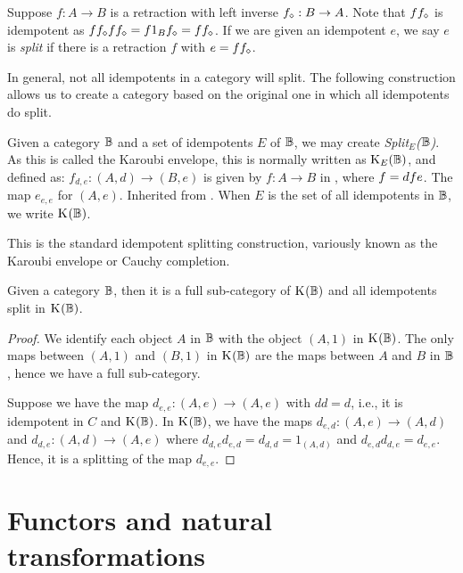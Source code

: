 Suppose $f:A \to B$ is a retraction with left inverse ${f}_\diamond:B \to A$. Note that $f
{f}_\diamond$ is idempotent as $f {f}_\diamond f {f}_\diamond = f 1_B {f}_\diamond = f
{f}_\diamond$. If we are given an idempotent $e$, we say $e$ is \emph{split} if there is a
retraction $f$ with $e = f {f}_\diamond$.

In general, not all idempotents in a category will split. The following construction allows us to
create a category based on the original one in which all idempotents do split.

\begin{definition}\label{def:split_category}
  Given a category $\mathbb{B}$ and a set of idempotents $E$ of $\mathbb{B}$, we may create \emph{Split${}_E$($\mathbb{B}$)}.
  As this is called the Karoubi envelope, this is normally written as $\text{K}_{E}(\mathbb{B})$, and defined as:
    {$f_{d,e}:(A,d)\to(B,e)$ is given by $f:A\to B$ in \B, where $f = d\hspace{0.1pt} f e$.}
    {The map $e_{e,e}$ for $(A,e)$.}
    {Inherited from \B.}
  When $E$ is the set of all idempotents in $\mathbb{B}$, we write $\text{K}_{}(\mathbb{B})$.
\end{definition}
This is the standard idempotent splitting construction, variously known as the Karoubi
envelope or Cauchy completion.

\begin{lemma}\label{lem:split_category_splits_and_has_category}
  Given a category $\mathbb{B}$, then it is a full sub-category of $\text{K}_{}(\mathbb{B})$ and all idempotents split
  in  $\text{K}_{}(\mathbb{B})$.
\end{lemma}
\begin{proof}
  We identify each object $A$ in $\mathbb{B}$ with the object $(A,1)$ in $\text{K}_{}(\mathbb{B})$. The only maps between
  $(A,1)$ and $(B,1)$ in $\text{K}_{}(\mathbb{B})$ are the maps between $A$ and $B$ in $\mathbb{B}$, hence we have a
  full sub-category.

  Suppose we have the map $d_{e,e}: (A,e) \to (A,e)$ with $d d = d$, i.e., it is idempotent in $C$
  and $\text{K}_{}(\mathbb{B})$. In $\text{K}_{}(\mathbb{B})$, we have the maps $d_{e,d}:(A,e) \to (A,d)$ and $d_{d,e}:(A,d) \to
  (A,e)$ where $d_{d,e} d_{e,d} = d_{d,d} = 1_{(A,d)}$ and $d_{e,d} d_{d,e} = d_{e,e}$. Hence,
  it is a splitting of the map  $d_{e,e}$.
\end{proof}

\section{Functors and natural transformations} %
\label{ssub:functors_and_natural_transformations}

